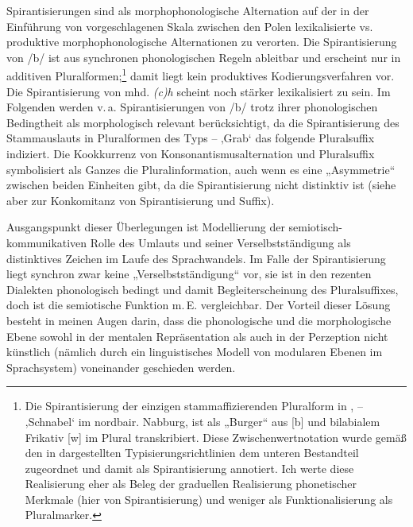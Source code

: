 Spirantisierungen sind als morphophonologische Alternation auf der in der Einführung von  vorgeschlagenen Skala zwischen den Polen lexikalisierte vs. produktive morphophonologische Alternationen zu verorten. Die Spirantisierung von /b/ ist aus synchronen phonologischen Regeln ableitbar und erscheint nur in additiven Pluralformen;\footnote{Die Spirantisierung der einzigen stammaffizierenden Pluralform in ,  --  ‚Schnabel‘ im nordbair. Nabburg, ist als „Burger“ aus [b] und bilabialem Frikativ [w] im Plural transkribiert. Diese Zwischenwertnotation wurde gemäß den in  dargestellten Typisierungsrichtlinien dem unteren Bestandteil zugeordnet und damit als Spirantisierung annotiert. Ich werte diese Realisierung eher als Beleg der graduellen Realisierung phonetischer Merkmale (hier von Spirantisierung) und weniger als Funktionalisierung als Pluralmarker.} damit liegt kein produktives Kodierungsverfahren vor. Die Spirantisierung von mhd. \textit{(c)h} scheint noch stärker lexikalisiert zu sein. Im Folgenden werden v.\,a. Spirantisierungen von /b/ trotz ihrer phonologischen Bedingtheit als morphologisch relevant berücksichtigt, da die Spirantisierung des Stammauslauts in Pluralformen des Typs  --  ‚Grab‘ das folgende Pluralsuffix indiziert. Die Kookkurrenz von Konsonantismusalternation und Pluralsuffix symbolisiert als Ganzes die Pluralinformation, auch wenn es eine „Asymmetrie“ \citep[194]{Ronneberger-Sibold1990} zwischen beiden Einheiten gibt, da die Spirantisierung nicht distinktiv ist (siehe aber  zur Konkomitanz von Spirantisierung und Suffix).

Ausgangspunkt dieser Überlegungen ist  Modellierung der semiotisch-kommunikativen Rolle des Umlauts und seiner Verselbstständigung als distinktives Zeichen im Laufe des Sprachwandels. Im Falle der Spirantisierung liegt synchron zwar keine „Verselbstständigung“ vor, sie ist in den rezenten Dialekten phonologisch bedingt und damit Begleiterscheinung des Pluralsuffixes, doch ist die semiotische Funktion m.\,E. vergleichbar. Der Vorteil dieser Lösung besteht in meinen Augen darin, dass die phonologische und die morphologische Ebene sowohl in der mentalen Repräsentation als auch in der Perzeption nicht künstlich (nämlich durch ein linguistisches Modell von modularen Ebenen im Sprachsystem) voneinander geschieden werden.

